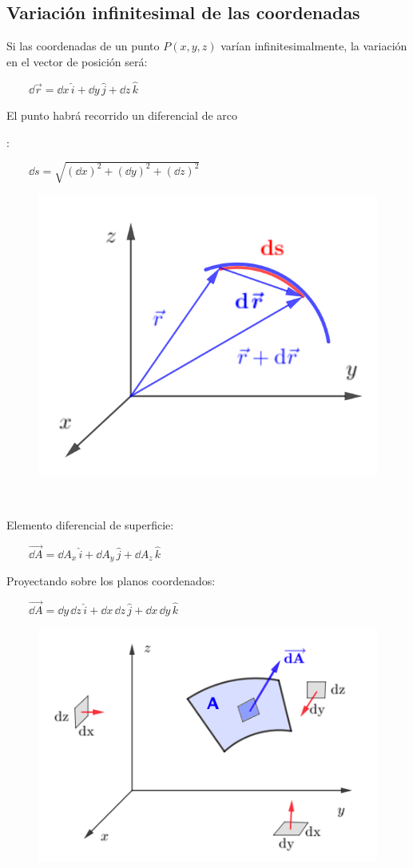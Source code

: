 \vspace{7mm}
\subsection{Variación infinitesimal de las coordenadas}
\vspace{-5mm}
\vspace{0.5cm}

\begin{multicols}{2}
\normalsize{Si} las coordenadas de un punto $P(x,y,z)$ varían infinitesimalmente, la variación en el vector de posición será:

$\qquad \dd \vec r=\dd x\, \widehat i +\dd y\, \widehat j +\dd z\, \widehat k$

\begin{small}El punto habrá recorrido un diferencial de arco\end{small}\normalsize{:}

$\qquad \dd  s = \sqrt{(\dd x)^2+(\dd y)^2+(\dd z)^2}$
	\begin{figure}[H]
	\centering
	\includegraphics[width=.35\textwidth]{img-coordenadas/coordenadas-05.png}
	\end{figure}
\end{multicols}

\vspace{0.5cm}
\begin{multicols}{2}
$\quad$

\normalsize{Elemento} diferencial de superficie:

$\qquad \overrightarrow{\dd A}=\dd A_x \, \widehat i+\dd A_y \, \widehat j+\dd A_z \, \widehat k$

Proyectando sobre los planos coordenados:

$\qquad \overrightarrow{\dd A}=\dd y \, \dd z \, \widehat i+\dd x \, \dd z \, \widehat j+ \dd x \, \dd y \, \widehat k$
	\begin{figure}[H]
	\centering
	\includegraphics[width=.4\textwidth]{img-coordenadas/coordenadas-06.png}
	\end{figure}
\end{multicols}

